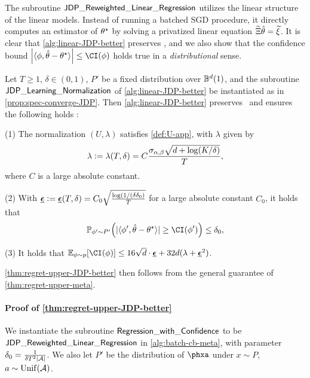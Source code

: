 The subroutine $\mathsf{JDP\_Reweighted\_Linear\_Regression}$ utilizes the linear structure of the linear models. Instead of running a batched SGD procedure, it directly computes an estimator of $\theta^\star$ by solving a privatized linear equation $\widetilde \Xi \hat{\theta}=\widetilde \xi$. It is clear that \cref{alg:linear-JDP-better} preserves \aJDP, and we also show that the confidence bound $\abs{\lr \x, \hth-\ths\rr}\leq \CI(\x)$ holds true in a \emph{distributional} sense.

\begin{proposition}\label{prop:linear-JDP-better}
Let $T\geq 1$, $\delta\in(0,1)$, $P'$ be a fixed distribution over $\mathbb{B}^d(1)$, and the subroutine $\mathsf{JDP\_Learning\_Normalization}$ of \cref{alg:linear-JDP-better} be instantiated as in \cref{prop:spec-converge-JDP}. Then \cref{alg:linear-JDP-better} preserves \aJDP~and ensures the following holds \whp:

(1) The normalization $(U,\lambda)$ satisfies \eqref{def:U-app}, with $\lambda$ given by
\begin{align}\label{eq:def:lambda-JDP-better}
    \lambda\mathrel{\mathop:}= \lambda(T,\delta)=C\frac{\sigma_{\alpha,\beta}\sqrt{d+\log(K/\delta)}}{T},
\end{align}
where $C$ is a large absolute constant. 

(2) With $\lamgd\defeq \lamgd(T,\delta)=C_0 \sqrt{\frac{\log(1/(\delta\delz)}{T}}$ for a large absolute constant $C_0$, it holds that 
\begin{align*}
    \PP_{\x'\sim P'}\paren{ \absn{ \lr \x', \hth-\ths \rr }\geq \CI(\x') }\leq \delz,
\end{align*}

(3) It holds that $\Ep{\CI(\x)}\leq 16\sqrt{d}\cdot \lamgd+32d(\lambda+\lamgd^2)$.
\end{proposition}

\cref{thm:regret-upper-JDP-better} then follows from the general guarantee of \cref{thm:regret-upper-meta}.

\paragraph{Proof of \cref{thm:regret-upper-JDP-better}}
We instantiate the subroutine $\mathsf{Regression\_with\_Confidence}$ to be \\ $\mathsf{JDP\_Reweighted\_Linear\_Regression}$ in \cref{alg:batch-cb-meta}, with parameter $\delta_0=\frac{1}{\delta T^2|\mathcal{A}|}$.
We also let $P'$ be the distribution of $\phxa$ under $x\sim P$, $a\sim \mathrm{Unif}(\mathcal{A})$.

